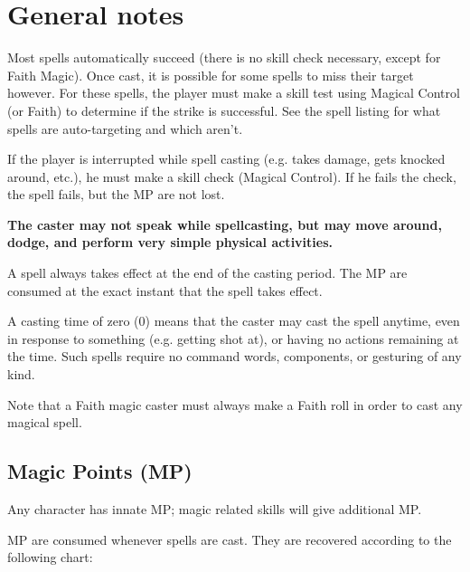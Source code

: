 \documentclass[twoside]{book}
\begin{document}
    

\section{General notes}
    
    {  
    Most spells automatically succeed (there is no skill check necessary, except for Faith Magic). Once cast, it is possible for some spells to miss their target however. For these spells, the player must make a skill test using Magical Control (or Faith) to determine if the strike is successful. See the spell listing for what spells are auto-targeting and which aren't.
    }
  
    {  
    If the player is interrupted while spell casting (e.g. takes damage, gets knocked around, etc.), he must make a skill check (Magical Control). If he fails the check, the spell fails, but the MP are not lost.

 \textbf{The caster may not speak while spellcasting, but may move around, dodge, and perform very simple physical activities.}


    }
  
    {  
    A spell always takes effect at the end of the casting period. The MP are consumed at the exact instant that the spell takes effect.
    }
  
    {  
    A casting time of zero (0) means that the caster may cast the spell anytime, even in response to something (e.g. getting shot at), or having no actions remaining at the time. Such spells require no command words, components, or gesturing of any kind.
    }
  
    {  
    Note that a Faith magic caster must always make a Faith roll in order to cast any magical spell.
    }
  
    

\subsection{Magic Points (MP)}
    
    {  
    Any character has innate MP; magic related skills will give additional MP.
    }
  
    {  
    MP are consumed whenever spells are cast. They are recovered according to the following chart:
    }
  
\end{document}
